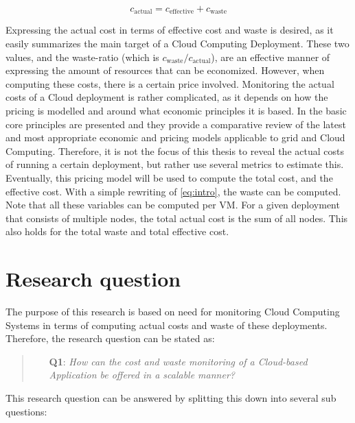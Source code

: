 \begin{equation}\label{eq:intro}
  c_\text{actual} = c_\text{effective} + c_\text{waste}  
\end{equation}

\noindent
Expressing the actual cost in terms of effective cost and waste is desired, as it easily summarizes the main target of a Cloud Computing Deployment. These two values, and the waste-ratio (which is $c_\text{waste} / c_\text{actual}$), are an effective manner of expressing the amount of resources that can be economized. However, when computing these costs, there is a certain price involved. Monitoring the actual costs of a Cloud deployment is rather complicated, as it depends on how the pricing is modelled and around what economic principles it is based. In \cite{samimi2011review} the basic core principles are presented and they provide a comparative review of the latest and most appropriate economic and pricing models applicable to grid and Cloud Computing. Therefore, it is not the focus of this thesis to reveal the actual costs of running a certain deployment, but rather use several metrics to estimate this. Eventually, this pricing model will be used to compute the total cost, and the effective cost. With a simple rewriting of \autoref{eq:intro}, the waste can be computed. Note that all these variables can be computed per VM. For a given deployment that consists of multiple nodes, the total actual cost is the sum of all nodes. This also holds for the total waste and total effective cost.

\section{Research question} \label{sec:research_question}
The purpose of this research is based on need for monitoring Cloud Computing Systems in terms of computing actual costs and waste of these deployments. Therefore, the research question can be stated as:

\begin{quote}
    \begin{itemize}
        \item[\textbf{Q1}: ]\textit{How can the cost and waste monitoring of a Cloud-based Application be offered in a scalable manner?}
    \end{itemize}
\end{quote}

\noindent
This research question can be answered by splitting this down into several sub questions:

